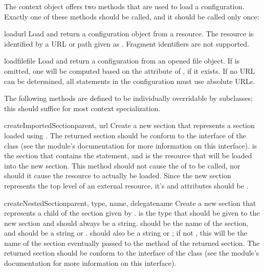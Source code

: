 \documentclass{howto}
\begin{document}
The context object offers two methods that are used to load a
configuration.  Exactly one of these methods should be called, and it
should be called only once:

\begin{methoddesc}{load}{url}
  Load and return a configuration object from a resource.  The
  resource is identified by a URL or path given as .
  Fragment identifiers are not supported.
\end{methoddesc}

\begin{methoddesc}{loadfile}{file}
  Load and return a configuration from an opened file object.
  If  is omitted, one will be computed based on the
   attribute of , if it exists.  If no URL can
  be determined, all  statements in the configuration
  must use absolute URLs.
\end{methoddesc}

The following methods are defined to be individually overridable by
subclasses; this should suffice for most context specialization.

\begin{methoddesc}{createImportedSection}{parent, url}
  Create a new section that represents a section loaded using
  .  The returned section should be conform to the
  interface of the  class (see the
   module's documentation for more
  information on this interface).   is the section that
  contains the  statement, and  is the
  resource that will be loaded into the new section.  This method
  should not cause the  of  to be
  called, nor should it cause the resource to actually be loaded.
  Since the new section represents the top level of an external
  resource, it's  and  attributes should be
  .
\end{methoddesc}

\begin{methoddesc}{createNestedSection}{parent, type, name, delegatename}
  Create a new section that represents a child of the section given by
  .   is the type that should be given to the
  new section and should always be a string.   should be the
  name of the section, and should be a string or .
   should also be a string or ; if not
  , this will be the name of the section eventually passed
  to the  method of the returned section.  The
  returned section should be conform to the interface of the
   class (see the 
  module's documentation for more information on this interface).
\end{methoddesc}
\end{document}
